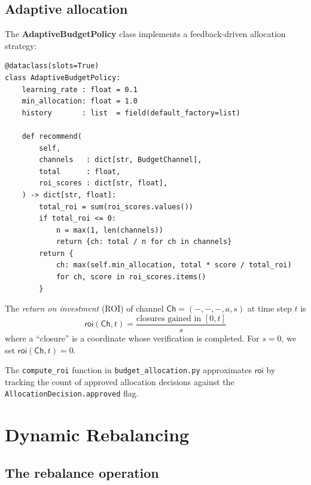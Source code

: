 \documentclass[11pt]{article}
\providecommand{\Chan}{\mathsf{Ch}}            %
\providecommand{\ROI}{\mathsf{roi}}            %
\begin{document}
\subsection{Adaptive allocation}

The \textbf{AdaptiveBudgetPolicy} class implements a feedback-driven
allocation strategy:

\begin{lstlisting}[style=jugeo-python]
@dataclass(slots=True)
class AdaptiveBudgetPolicy:
    learning_rate : float = 0.1
    min_allocation: float = 1.0
    history       : list  = field(default_factory=list)

    def recommend(
        self,
        channels   : dict[str, BudgetChannel],
        total      : float,
        roi_scores : dict[str, float],
    ) -> dict[str, float]:
        total_roi = sum(roi_scores.values())
        if total_roi <= 0:
            n = max(1, len(channels))
            return {ch: total / n for ch in channels}
        return {
            ch: max(self.min_allocation, total * score / total_roi)
            for ch, score in roi_scores.items()
        }
\end{lstlisting}

\begin{definition}\label{def:roi}
The \emph{return on investment} (ROI) of channel $\Chan = (-, -, -, a, s)$ at
time step $t$ is
\[
  \ROI(\Chan, t) = \frac{\text{closures gained in } [0,t]}{s}
\]
where a ``closure'' is a coordinate whose verification is completed.
For $s = 0$, we set $\ROI(\Chan, t) = 0$.
\end{definition}

\begin{remark}
The \texttt{compute\_roi} function in \texttt{budget\_allocation.py}
approximates $\ROI$ by tracking the count of approved allocation
decisions against the \texttt{AllocationDecision.approved} flag.
\end{remark}

\section{Dynamic Rebalancing}\label{sec:rebalancing}

\subsection{The rebalance operation}
\end{document}
